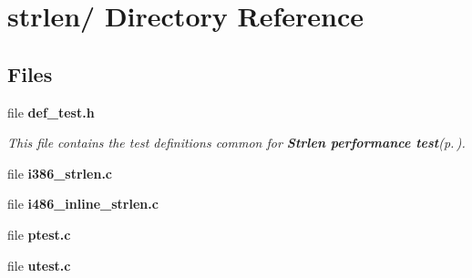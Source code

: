 \section{strlen/ Directory Reference}
\label{dir_000006}
\subsection*{Files}
\begin{CompactItemize}
\item 
file {\bf def\_\-test.h}
\begin{CompactList}\small\item\em This file contains the test definitions common for {\bf Strlen performance test}{\rm (p.\,\pageref{group__strlen__test})}. \item\end{CompactList}

\item 
file {\bf i386_strlen.c}
\item 
file {\bf i486_inline_strlen.c}
\item 
file {\bf ptest.c}
\item 
file {\bf utest.c}
\end{CompactItemize}
